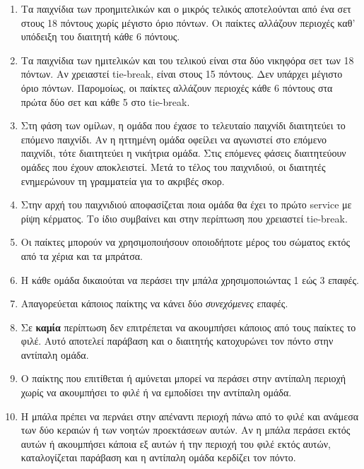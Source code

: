 \documentclass[a4paper,11pt]{article}
\begin{document}
\begin{enumerate}
\item Τα παιχνίδια των προημιτελικών και ο μικρός τελικός αποτελούνται από ένα
  σετ στους 18 πόντους χωρίς μέγιστο όριο πόντων. Οι παίκτες αλλάζουν περιοχές
  καθ' υπόδειξη του διαιτητή κάθε 6 πόντους.

\item Τα παιχνίδια των ημιτελικών και του τελικού είναι στα δύο νικηφόρα σετ των
  18 πόντων. Αν χρειαστεί tie-break, είναι στους 15 πόντους. Δεν υπάρχει μέγιστο
  όριο πόντων. Παρομοίως, οι παίκτες αλλάζουν περιοχές κάθε 6 πόντους στα πρώτα
  δύο σετ και κάθε 5 στο tie-break.

\item Στη φάση των ομίλων, η ομάδα που έχασε το τελευταίο παιχνίδι διαιτητεύει
  το επόμενο παιχνίδι. Αν η ηττημένη ομάδα οφείλει να αγωνιστεί στο επόμενο
  παιχνίδι, τότε διαιτητεύει η νικήτρια ομάδα. Στις επόμενες φάσεις διαιτητεύουν
  ομάδες που έχουν αποκλειστεί. Μετά το τέλος του παιχνιδιού, οι διαιτητές
  ενημερώνουν τη γραμματεία για το ακριβές σκορ.

\item Στην αρχή του παιχνιδιού αποφασίζεται ποια ομάδα θα έχει το πρώτο service
  με ρίψη κέρματος. Το ίδιο συμβαίνει και στην περίπτωση που χρειαστεί
  tie-break.

\item Οι παίκτες μπορούν να χρησιμοποιήσουν οποιοδήποτε μέρος του σώματος εκτός
  από τα χέρια και τα μπράτσα.

\item Η κάθε ομάδα δικαιούται να περάσει την μπάλα χρησιμοποιώντας 1 εώς 3
  επαφές.

\item Απαγορεύεται κάποιος παίκτης να κάνει δύο \textit{συνεχόμενες} επαφές.

\item Σε \textbf{καμία} περίπτωση δεν επιτρέπεται να ακουμπήσει κάποιος από τους
  παίκτες το φιλέ. Αυτό αποτελεί παράβαση και ο διαιτητής κατοχυρώνει τον πόντο
  στην αντίπαλη ομάδα.

\item Ο παίκτης που επιτίθεται ή αμύνεται μπορεί να περάσει στην αντίπαλη
  περιοχή χωρίς να ακουμπήσει το φιλέ ή να εμποδίσει την αντίπαλη ομάδα.

\item Η μπάλα πρέπει να περνάει στην απέναντι περιοχή πάνω από το φιλέ και
  ανάμεσα των δύο κεραιών ή των νοητών προεκτάσεων αυτών. Αν η μπάλα περάσει
  εκτός αυτών ή ακουμπήσει κάποια εξ αυτών ή την περιοχή του φιλέ εκτός αυτών,
  καταλογίζεται παράβαση και η αντίπαλη ομάδα κερδίζει τον πόντο.


\end{enumerate}
\end{document}
